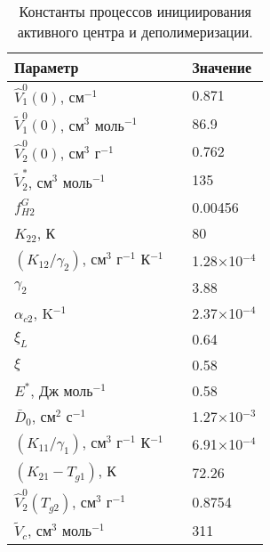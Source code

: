 \begin{table}[h]
	\centering
	\caption{Константы процессов инициирования активного центра и деполимеризации.}
	\begin{tabular}{l c l}
		\hline \hline
		Параметр & \hspace{4em} & Значение \\ \hline
		$\hat{V}_1^0(0)$, см$^{-1}$ & \hspace{1em} & 0.871 \\
		$\tilde{V}_1^0(0)$, см$^3$ моль$^{-1}$ & \hspace{1em} & 86.9 \\
		$\hat{V}_2^0(0)$, см$^3$ г$^{-1}$ & \hspace{1em} & 0.762 \\
		$\tilde{V}_2^*$, см$^3$ моль$^{-1}$ & \hspace{1em} & 135 \\
		$f_{H2}^{G}$ & \hspace{1em} & 0.00456 \\
		$K_{22}$, К & \hspace{1em} & 80 \\
		$(K_{12} / \gamma_2)$, см$^3$ г$^{-1}$ К$^{-1}$ & \hspace{1em} & 1.28$\times$10$^{-4}$ \\
		$\gamma_2$ & \hspace{1em} & 3.88 \\
		$\alpha_{c2}$, K$^{-1}$ & \hspace{1em} & 2.37$\times$10$^{-4}$ \\
		$\xi_L$ & \hspace{1em} & 0.64 \\
		$\xi$ & \hspace{1em} & 0.58 \\
		$E^*$, Дж моль$^{-1}$ & \hspace{1em} & 0.58 \\
		$\bar{D}_0$, см$^2$ с$^{-1}$ & \hspace{1em} & 1.27$\times$10$^{-3}$ \\
		$(K_{11} / \gamma_1)$, см$^3$ г$^{-1}$ К$^{-1}$ & \hspace{1em} & 6.91$\times$10$^{-4}$ \\
		$(K_{21}-T_{g1})$, К & \hspace{1em} & 72.26 \\
		$\hat{V}_2^0(T_{g2})$, см$^3$ г$^{-1}$ & \hspace{1em} & 0.8754 \\
		$\tilde{V}_c$, см$^3$ моль$^{-1}$ & \hspace{1em} & 311 \\
		\hline \hline
	\end{tabular}
	\label{table:D_free_volume}
\end{table}


